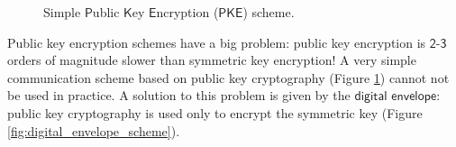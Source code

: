 \documentclass{article}
\begin{document}
\begin{figure}
    \centering
    \caption{Simple $\mathsf{P}$ublic $\mathsf{K}$ey $\mathsf{E}$ncryption ($\mathsf{PKE}$) scheme.}
    \label{fig:pke_scheme}
\end{figure}

\par \noindent Public key encryption schemes have a big problem: public key encryption is $\mathsf{2\text{-}3}$ orders of magnitude slower than symmetric key encryption! A very simple communication scheme based on public key cryptography (Figure \ref{fig:pke_scheme}) cannot not be used in practice. A solution to this problem is given by the $\mathsf{digital}$ $\mathsf{envelope}$: public key cryptography is used only to encrypt the symmetric key (Figure \ref{fig:digital_envelope_scheme}). \newline
\end{document}
